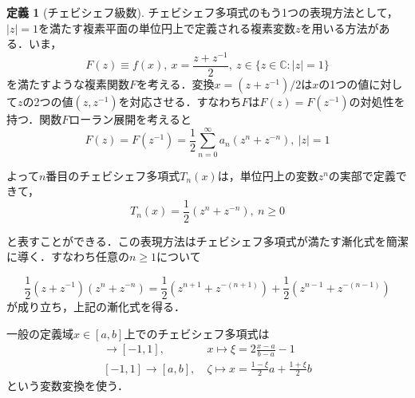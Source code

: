 \documentclass[11pt,a4paper]{jsarticle}
\theoremstyle{definition}
\newtheorem{dfn}{定義}
\begin{document}
\begin{dfn}[チェビシェフ級数]
  チェビシェフ多項式のもう1つの表現方法として，$|z|=1$を満たす複素平面の単位円上で定義される複素変数$z$を用いる方法がある．いま，
  \begin{equation*}
    F(z) \equiv f(x),\ x=\frac{z+z^{-1}}{2},\ z\in\{z\in\mathbb{C}:|z|=1\}
  \end{equation*}
  を満たすような複素関数$F$を考える．変換$x=(z+z^{-1})/2$は$x$の1つの値に対して$z$の2つの値$(z,z^{-1})$を対応させる．すなわち$F$は$F(z)=F(z^{-1})$の対処性を持つ．関数$F$ローラン展開を考えると
  \begin{equation*}
    F(z) = F(z^{-1}) = \frac{1}{2} \sum_{n=0}^{\infty} a_n (z^n + z^{-n}),\ |z|=1
  \end{equation*}

  よって$n$番目のチェビシェフ多項式$T_n(x)$は，単位円上の変数$z^n$の実部で定義できて，
  \begin{equation*}
    T_n(x) = \frac{1}{2} \left( z^n + z^{-n} \right),\ n \geq 0
  \end{equation*}

  と表すことができる．この表現方法はチェビシェフ多項式が満たす漸化式を簡潔に導く．すなわち任意の$n \geq 1$について

  \begin{equation*}
    \frac{1}{2} (z+z^{-1})(z^n + z^{-n}) = \frac{1}{2} (z^{n+1} + z^{-(n+1)}) + \frac{1}{2} (z^{n-1} + z^{-(n-1)})
  \end{equation*}
  が成り立ち，上記の漸化式を得る．

  一般の定義域$x\in [a,b]$上でのチェビシェフ多項式は
  \begin{align*}
    [a,b]   \rightarrow [-1,1], & \ x \mapsto \xi = 2\frac{x-a}{b-a} - 1                  \\
    [-1,1]  \rightarrow [a,b],  & \ \zeta \mapsto x = \frac{1-\xi}{2}a + \frac{1+\xi}{2}b
  \end{align*}
  という変数変換を使う．
\end{dfn}
\end{document}
